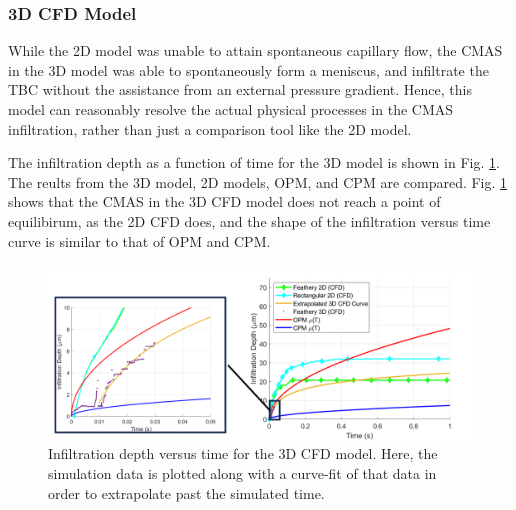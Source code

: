 \documentclass[%
 aip,
 amsmath,amssymb,
 reprint,%
]{revtex4-1}
\begin{document}

\subsubsection{3D CFD Model}

While the 2D model was unable to attain spontaneous capillary flow, the CMAS in the 3D model was able to spontaneously form a meniscus, and infiltrate the TBC without the assistance from an external pressure gradient. Hence, this model can reasonably resolve the actual physical processes in the CMAS infiltration, rather than just a comparison tool like the 2D model. 

The infiltration depth as a function of time for the 3D model is shown in Fig. \ref{fig:3D_results}. The reults from the 3D model, 2D models, OPM, and CPM are compared. Fig. \ref{fig:3D_results} shows that the CMAS in the 3D CFD model does not reach a point of equilibirum, as the 2D CFD does, and the shape of the infiltration versus time curve is similar to that of OPM and CPM. 

\begin{figure}
    \centering
    \includegraphics[width=\linewidth]{Figures/3D_results.png}
    \caption{Infiltration depth versus time for the 3D CFD model. Here, the simulation data is plotted along with a curve-fit of that data in order to extrapolate past the simulated time.}
    \label{fig:3D_results}
\end{figure}
\end{document}

